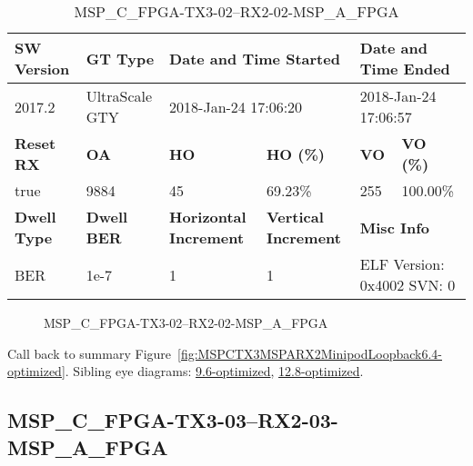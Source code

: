 \begin{table}[h]
\centering
\caption{MSP\_C\_FPGA-TX3-02--RX2-02-MSP\_A\_FPGA}
\label{tab:MSPCFPGATX302RX202MSPAFPGA6.4-optimized}
\begin{tabular}{@{}|l|l|l|l|l|l|@{}}
\toprule
\textbf{SW Version}                & \textbf{GT Type}   & \multicolumn{2}{l|}{\textbf{Date and Time Started}}            & \multicolumn{2}{l|}{\textbf{Date and Time Ended}}        \\ \midrule
2017.2                       & UltraScale GTY          & \multicolumn{2}{l|}{2018-Jan-24 17:06:20}                   & \multicolumn{2}{l|}{2018-Jan-24 17:06:57}               \\ \midrule
\textbf{Reset RX}                  & \textbf{OA} & \textbf{HO}   & \textbf{HO (\%)} & \textbf{VO} & \textbf{VO (\%)} \\ \midrule
true & 9884        & 45          & 69.23\%        & 255        & 100.00\%       \\ \midrule
\textbf{Dwell Type}                & \textbf{Dwell BER} & \textbf{Horizontal Increment} & \textbf{Vertical Increment}    & \multicolumn{2}{l|}{\textbf{Misc Info}}                  \\ \midrule
BER                            & 1e-7        & 1        & 1           & \multicolumn{2}{l|}{ELF Version: 0x4002 SVN: 0}                         \\ \bottomrule
\end{tabular}
\end{table}

\begin{figure}[h]
\caption{MSP\_C\_FPGA-TX3-02--RX2-02-MSP\_A\_FPGA} \label{fig:MSPCFPGATX302RX202MSPAFPGA6.4-optimized}
\end{figure}

Call back to summary Figure~\ref{fig:MSPCTX3MSPARX2MinipodLoopback6.4-optimized}.
Sibling eye diagrams: \hyperref[sec:MSPCFPGATX302RX202MSPAFPGA9.6-optimized]{9.6-optimized}, \hyperref[sec:MSPCFPGATX302RX202MSPAFPGA12.8-optimized]{12.8-optimized}.

\clearpage
\newpage


\subsection{MSP\_C\_FPGA-TX3-03--RX2-03-MSP\_A\_FPGA}\label{sec:MSPCFPGATX303RX203MSPAFPGA6.4-optimized}

